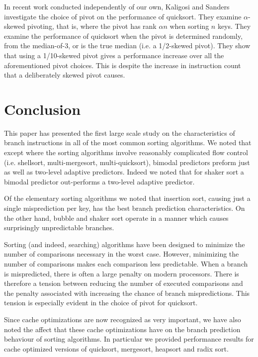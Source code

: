 \documentclass[acmtocl]{acmtrans2m}
\begin{document}
In recent work conducted independently of our own, Kaligosi and Sanders
\citeyear{Kaligosi+06} investigate the choice of pivot on the performance of
quicksort. They examine $\alpha$-skewed pivoting, that is, where the pivot has
rank $\alpha n$ when sorting $n$ keys. They examine the performance of quicksort
when the pivot is determined randomly, from the median-of-3, or is the true
median (i.e. a 1/2-skewed pivot). They show that using a 1/10-skewed pivot gives
a performance increase over all the aforementioned pivot choices. This is
despite the increase in instruction count that a deliberately skewed pivot
causes.

\section{Conclusion}

This paper has presented the first large scale study on the characteristics of
branch instructions in all of the most common sorting algorithms. We noted that
except where the sorting algorithms involve reasonably complicated flow control
(i.e. shellsort, multi-mergesort, multi-quicksort), bimodal predictors preform
just as well as two-level adaptive predictors. Indeed we noted that for shaker
sort a bimodal predictor out-performs a two-level adaptive predictor.

Of the elementary sorting algorithms we noted that insertion sort, causing just
a single misprediction per key, has the best branch prediction characteristics.
On the other hand, bubble and shaker sort operate in a manner which causes
surprisingly unpredictable branches.

Sorting (and indeed, searching) algorithms have been designed to minimize the
number of comparisons necessary in the worst case. However, minimizing the
number of comparisons makes each comparison less predictable. When a branch is
mispredicted, there is often a large penalty on modern processors.  There is
therefore a tension between reducing the number of executed comparisons and the
penalty associated with increasing the chance of branch mispredictions. This
tension is especially evident in the choice of pivot for quicksort.

Since cache optimizations are now recognized as very important, we have also
noted the affect that these cache optimizations have on the branch prediction
behaviour of sorting algorithms. In particular we provided performance results
for cache optimized versions of quicksort, mergesort, heapsort and radix sort.
\end{document}
